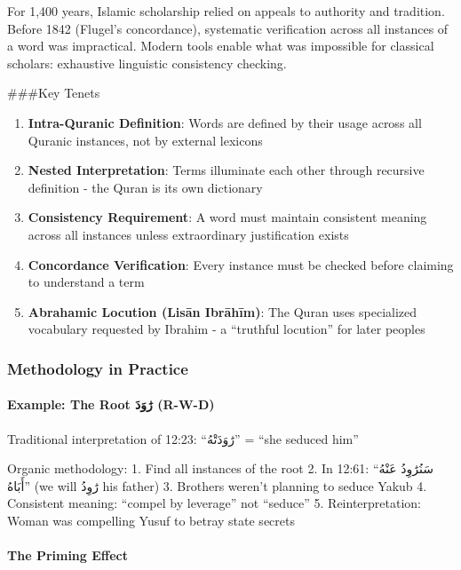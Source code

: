 \documentclass[12pt,a4paper]{article}
\providecommand{\tightlist}{\setlength{\itemsep}{0pt}\setlength{\parskip}{0pt}}
\begin{document}
For 1,400 years, Islamic scholarship relied on appeals to authority and
tradition. Before 1842 (Flugel's concordance), systematic verification
across all instances of a word was impractical. Modern tools enable what
was impossible for classical scholars: exhaustive linguistic consistency
checking.

\#\#\#Key Tenets

\begin{enumerate}
\def\labelenumi{\arabic{enumi}.}
\tightlist
\item
  \textbf{Intra-Quranic Definition}: Words are defined by their usage
  across all Quranic instances, not by external lexicons
\item
  \textbf{Nested Interpretation}: Terms illuminate each other through
  recursive definition - the Quran is its own dictionary
\item
  \textbf{Consistency Requirement}: A word must maintain consistent
  meaning across all instances unless extraordinary justification exists
\item
  \textbf{Concordance Verification}: Every instance must be checked
  before claiming to understand a term
\item
  \textbf{Abrahamic Locution (Lisān Ibrāhīm)}: The Quran uses
  specialized vocabulary requested by Ibrahim - a ``truthful locution''
  for later peoples
\end{enumerate}

\subsubsection{Methodology in Practice}\label{methodology-in-practice}

\paragraph{Example: The Root رَٰوَدَ
(R-W-D)}\label{example-the-root-ux631ux648ux62f-r-w-d}

Traditional interpretation of 12:23: ``رَٰوَدَتْهُ'' = ``she seduced him''

Organic methodology: 1. Find all instances of the root 2. In 12:61:
``سَنُرَٰوِدُ عَنْهُ أَبَاهُ'' (we will رَٰوِدُ his father) 3. Brothers weren't planning
to seduce Yakub 4. Consistent meaning: ``compel by leverage'' not
``seduce'' 5. Reinterpretation: Woman was compelling Yusuf to betray
state secrets

\paragraph{The Priming Effect}\label{the-priming-effect}
\end{document}
